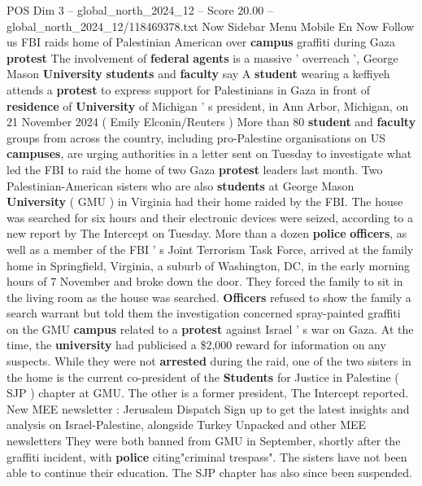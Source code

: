 \begin{textsample}{POS Dim 3 – global\_north\_2024\_12 – Score 20.00 – global\_north\_2024\_12/118469378.txt}  \label{ex:f3_pos_230}
Now Sidebar Menu Mobile En Now Follow us FBI raids home of Palestinian American over \textbf{campus} graffiti during Gaza \textbf{protest} The involvement of \textbf{federal} \textbf{agents} is a massive ' overreach ', George Mason \textbf{University} \textbf{students} and \textbf{faculty} say A \textbf{student} wearing a keffiyeh attends a \textbf{protest} to express support for Palestinians in Gaza in front of \textbf{residence} of \textbf{University} of Michigan ' s president, in Ann Arbor, Michigan, on 21 November 2024 ( Emily Elconin/Reuters ) More than 80 \textbf{student} and \textbf{faculty} groups from across the country, including pro-Palestine organisations on US \textbf{campuses}, are urging authorities in a letter sent on Tuesday to investigate what led the FBI to raid the home of two Gaza \textbf{protest} leaders last month.
Two Palestinian-American sisters who are also \textbf{students} at George Mason \textbf{University} ( GMU ) in Virginia had their home raided by the FBI.
The house was searched for six hours and their electronic devices were seized, according to a new report by The Intercept on Tuesday.
More than a dozen \textbf{police} \textbf{officers}, as well as a member of the FBI ' s Joint Terrorism Task Force, arrived at the family home in Springfield, Virginia, a suburb of Washington, DC, in the early morning hours of 7 November and broke down the door.
They forced the family to sit in the living room as the house was searched. \textbf{Officers} refused to show the family a search warrant but told them the investigation concerned spray-painted graffiti on the GMU \textbf{campus} related to a \textbf{protest} against Israel ' s war on Gaza.
At the time, the \textbf{university} had publicised a \$2,000 reward for information on any suspects.
While they were not \textbf{arrested} during the raid, one of the two sisters in the home is the current co-president of the \textbf{Students} for Justice in Palestine ( SJP ) chapter at GMU.
The other is a former president, The Intercept reported.
New MEE newsletter : Jerusalem Dispatch Sign up to get the latest insights and analysis on Israel-Palestine, alongside Turkey Unpacked and other MEE newsletters They were both banned from GMU in September, shortly after the graffiti incident, with \textbf{police} citing"criminal trespass".
The sisters have not been able to continue their education.
The SJP chapter has also since been suspended.

\end{textsample}
